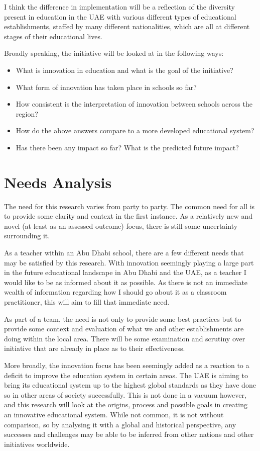 I think the difference in implementation will be a reflection of the diversity present in education in the UAE with various different types of educational establishments, staffed by many different nationalities, which are all at different stages of their educational lives.

Broadly speaking, the initiative will be looked at in the following ways: 

\begin{itemize}
\item What is innovation in education and what is the goal of the initiative?
\item What form of innovation has taken place in schools so far?
\item How consistent is the interpretation of innovation between schools across the region?
\item How do the above answers compare to a more developed educational system?
\item Has there been any impact so far? What is the predicted future impact?
\end{itemize}

\section{Needs Analysis}

The need for this research varies from party to party. The common need for  all is to provide some clarity and context in the first instance. As a relatively new and novel (at least as an assessed outcome) focus, there is still some uncertainty surrounding it.

As a teacher within an Abu Dhabi school, there are a few different needs that may be satisfied by this research. With innovation seemingly playing a large part in the future educational landscape in Abu Dhabi and the UAE, as a teacher I would like to be as informed about it as possible. As there is not an immediate wealth of information regarding how I should go about it as a classroom practitioner, this will aim to fill that immediate need.

As part of a team, the need is not only to provide some best practices but to provide some context and evaluation of what we and other establishments are doing within the local area. There will be some examination and scrutiny over initiative that are already in place as to their effectiveness.

More broadly, the innovation focus has been seemingly added as a reaction to a deficit to improve the education system in certain areas. The UAE is aiming to bring its educational system up to the highest global standards as they have done so in other areas of society successfully. This is not done in a vacuum however, and this research will look at the origins, process and possible goals in creating an innovative educational system. While not common, it is not without comparison, so by analysing it with a global and historical perspective, any successes and challenges may be able to be inferred from other nations and other initiatives worldwide.


